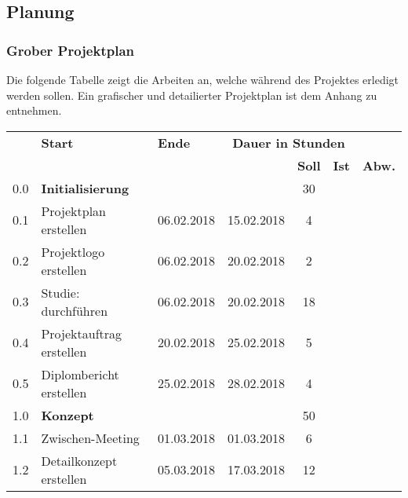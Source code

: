 \newpage
\subsection{Planung} 
\subsubsection{Grober Projektplan}
Die folgende Tabelle zeigt die Arbeiten an, welche während des Projektes erledigt werden sollen. Ein grafischer und detailierter Projektplan ist dem Anhang zu entnehmen.

\begin{table}[H]
\centering
\begin{tabular}{p{0.7cm}p{6.8cm}p{2cm}p{2cm}|c|c|c|}

\hline
\rowcolor{heading}\multicolumn{2}{l}{\textbf{Aufgabe}} & \textbf{Start} & \textbf{Ende} & \multicolumn{3}{c|}{\textbf{Dauer in Stunden}} \\
\rowcolor{heading}& & & & \textbf{Soll} & \textbf{Ist} & \textbf{Abw.} \\\hline
\rowcolor{subheading} 0.0 & \textbf{Initialisierung} & & & 30 & & \\\hline
0.1 & Projektplan erstellen & 06.02.2018 & 15.02.2018  & 4 & & \\\hline
0.2 & Projektlogo erstellen & 06.02.2018 & 20.02.2018 & 2 & &\\\hline
0.3 & Studie: durchführen   & 06.02.2018 & 20.02.2018 & 18 & &\\\hline
0.4 & Projektauftrag erstellen & 20.02.2018 & 25.02.2018 & 5 & &\\\hline
0.5 & Diplombericht erstellen  & 25.02.2018 & 28.02.2018 & 4 & &\\\hline
\rowcolor{subheading} 1.0 &\textbf{Konzept} & & & 50 & & \\\hline
1.1 & Zwischen-Meeting & 01.03.2018 & 01.03.2018 & 6 & &\\\hline
1.2 & Detailkonzept erstellen & 05.03.2018 & 17.03.2018 & 12 & & \\\hline

\end{tabular}
\end{table}
